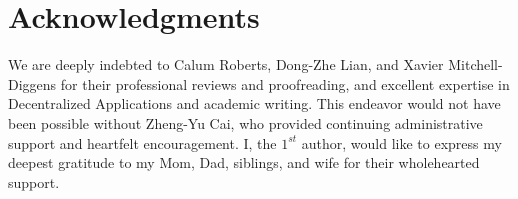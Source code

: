 \documentclass{article}
\begin{document}
\section*{Acknowledgments}
\label{Acknowledgments}

We are deeply indebted to 
Calum Roberts, Dong-Zhe Lian, and Xavier Mitchell-Diggens
for their professional reviews and proofreading,
and excellent expertise in Decentralized Applications and academic writing.
This endeavor would not have been possible without Zheng-Yu Cai, who 
provided continuing administrative support and heartfelt encouragement.
I, the $1^{st}$ author, would like to express my deepest gratitude to 
my Mom, Dad, siblings, and wife for their wholehearted support.

\nocite{*}
\printbibliography
\end{document}
